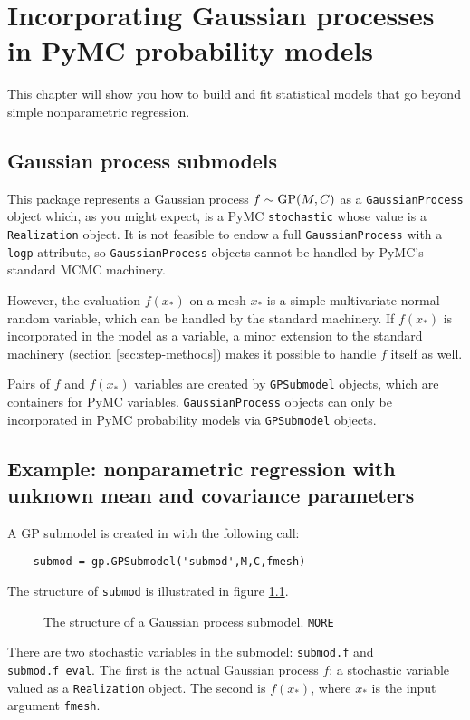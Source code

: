 \chapter{Incorporating Gaussian processes in PyMC probability models}\label{cha:PyMC}
This chapter will show you how to build and fit statistical models that go beyond simple nonparametric regression.

\section{Gaussian process submodels}

This package represents a Gaussian process $f\sim \textup{GP}(M,C)$ as a \texttt{GaussianProcess} object which, as you might expect, is a PyMC \texttt{stochastic} whose value is a \texttt{Realization} object. It is not feasible to endow a full \texttt{GaussianProcess} with a \texttt{logp} attribute, so \texttt{GaussianProcess} objects cannot be handled by PyMC's standard MCMC machinery.

However, the evaluation $f(x_*)$ on a mesh $x_*$ is a simple multivariate normal random variable, which can be handled by the standard machinery. If $f(x_*)$ is incorporated in the model as a variable, a minor extension to the standard machinery (section \ref{sec:step-methods}) makes it possible to handle $f$ itself as well.

Pairs of $f$ and $f(x_*)$ variables are created by \texttt{GPSubmodel} objects, which are containers for PyMC variables. \texttt{GaussianProcess} objects can only be incorporated in PyMC probability models via \texttt{GPSubmodel} objects.

\section{Example: nonparametric regression with unknown mean and covariance parameters}\label{sub:BasicMCMC}

A GP submodel is created in  with the following call:
\begin{verbatim}
    submod = gp.GPSubmodel('submod',M,C,fmesh)
\end{verbatim}
The structure of \texttt{submod} is illustrated in figure \ref{fig:gpsub}.
\begin{figure}
    \begin{center}
        \caption{The structure of a Gaussian process submodel. \texttt{MORE}}
        \label{fig:gpsub}  
    \end{center}
\end{figure}  
There are two stochastic variables in the submodel: \texttt{submod.f} and \texttt{submod.f_eval}. The first is the actual Gaussian process $f$: a stochastic variable valued as a \texttt{Realization} object. The second is $f(x_*)$, where $x_*$ is the input argument \texttt{fmesh}.

